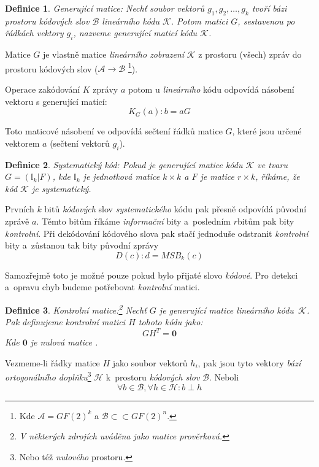 \documentclass[thesis=M,czech,hidelinks]{FITthesis}[2012/06/26]
\newcommand{\0}{{\textcolor[gray]{0.80}{0}}}
\newtheorem{definice}{Definice}
\begin{document}
\begin{definice}{Generující matice:}
    Nechť soubor vektorů $g_1,g_2,\ldots,g_k$ tvoří bázi prostoru
    kódových slov $\mathcal{B}$ \emph{lineárního kódu} $\mathcal{K}$. Potom
    matici $G$, sestavenou po řádkách vektory $g_i$, nazveme \emph{generující
    maticí} kódu $\mathcal{K}$.
\end{definice}

Matice $G$ je vlastně matice \emph{lineárního zobrazení} $\mathcal{K}$ z
prostoru (všech) zpráv do prostoru kódových slov ($\mathcal{A} \to
\mathcal{B}$ \footnote{
    Kde $\mathcal{A} = GF(2)^k$ a $\mathcal{B} \subset \subset GF(2)^n$.
}).

Operace zakódování $K$ zprávy $a$ potom u \emph{lineárního} kódu odpovídá
násobení vektoru s generující maticí:
$$ K_G(a) : b = aG $$

Toto maticové násobení ve odpovídá sečtení řádků matice $G$, které
jsou určené vektorem $a$ (sečtení vektorů $g_i$).

\begin{definice}{Systematický kód:}
    Pokud je \emph{generující} matice kódu $\mathcal{K}$ ve tvaru \\
    $G=(\mathbb{I}_k|F)$, kde $\mathbb{I}_k$ je jednotková matice $k \times k$ a
    $F$ je matice $r \times k$, říkáme, že kód $\mathcal{K}$ je
    \emph{systematický}.
\end{definice}

Prvních $k$ bitů \emph{kódových} slov \emph{systematického} kódu pak přesně
odpovídá původní zprávě $a$. Těmto bitům říkáme \emph{informační} bity
a~posledním $r$\;bitům pak bity \emph{kontrolní}. Při dekódování kódového slova
pak stačí jednoduše odstranit \emph{kontrolní} bity a~zůstanou tak bity původní
zprávy
$$ D(c) : d = MSB_k(c) $$

Samozřejmě toto je možné pouze pokud bylo přijaté slovo \emph{kódové}. Pro
detekci a~opravu chyb budeme potřebovat \emph{kontrolní} matici.

\begin{definice}{Kontrolní matice:}\footnote{
    V některých zdrojích uváděna jako matice \emph{prověrková}.
}
    Nechť $G$ je \emph{generující} matice \emph{lineárního kódu}~$\mathcal{K}$.
    Pak definujeme \emph{kontrolní matici} $H$ tohoto kódu jako:
    $$ G H^T = \textbf{0} $$
    Kde $\textbf{0}$ je \emph{nulová matice} .
\end{definice}


Vezmeme-li řádky matice $H$ jako soubor vektorů $h_i$, pak jsou tyto vektory
\emph{bází} \emph{ortogonálního doplňku}\footnote{
    Nebo též \emph{nulového} prostoru.
} $\mathcal{H}$ k~prostoru \emph{kódových
slov} $\mathcal{B}$. Neboli
$$ \forall b \in \mathcal{B}, \forall h \in \mathcal{H} : b \perp h $$
\end{document}
